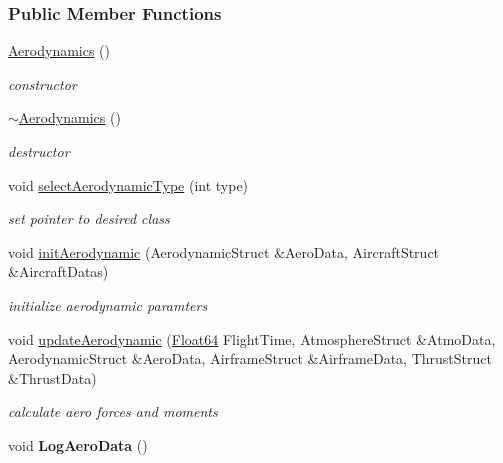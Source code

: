 \subsubsection*{Public Member Functions}
\begin{DoxyCompactItemize}
\item 
\mbox{\label{group___aerodynamic_a36c7ae850ce18605cdbf3ce1709d8e54}} 
\hyperlink{group___aerodynamic_a36c7ae850ce18605cdbf3ce1709d8e54}{Aerodynamics} ()
\begin{DoxyCompactList}\small\item\em constructor \end{DoxyCompactList}\item 
\mbox{\label{group___aerodynamic_af0e048e0c80ec8334997b79b761fea60}} 
\hyperlink{group___aerodynamic_af0e048e0c80ec8334997b79b761fea60}{$\sim$\+Aerodynamics} ()
\begin{DoxyCompactList}\small\item\em destructor \end{DoxyCompactList}\item 
\mbox{\label{group___aerodynamic_a9aa3397e8b1d91ed237146a57bbe6bcf}} 
void \hyperlink{group___aerodynamic_a9aa3397e8b1d91ed237146a57bbe6bcf}{select\+Aerodynamic\+Type} (int type)
\begin{DoxyCompactList}\small\item\em set pointer to desired class \end{DoxyCompactList}\item 
\mbox{\label{group___aerodynamic_aa4fee96e5b485cac47b3bc2127a6d4e2}} 
void \hyperlink{group___aerodynamic_aa4fee96e5b485cac47b3bc2127a6d4e2}{init\+Aerodynamic} (Aerodynamic\+Struct \&Aero\+Data, Aircraft\+Struct \&Aircraft\+Datas)
\begin{DoxyCompactList}\small\item\em initialize aerodynamic paramters \end{DoxyCompactList}\item 
\mbox{\label{group___aerodynamic_adf6047b063022ff3b689e269d2b35863}} 
void \hyperlink{group___aerodynamic_adf6047b063022ff3b689e269d2b35863}{update\+Aerodynamic} (\hyperlink{group___tools_ga3f1431cb9f76da10f59246d1d743dc2c}{Float64} Flight\+Time, Atmosphere\+Struct \&Atmo\+Data, Aerodynamic\+Struct \&Aero\+Data, Airframe\+Struct \&Airframe\+Data, Thrust\+Struct \&Thrust\+Data)
\begin{DoxyCompactList}\small\item\em calculate aero forces and moments \end{DoxyCompactList}\item 
\mbox{\label{group___aerodynamic_aa7af099a965b08deb4e86753149522e9}} 
void {\bfseries Log\+Aero\+Data} ()
\end{DoxyCompactItemize}
\label{class_base_aerodynamic}
